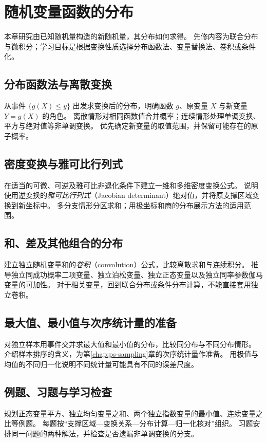 \setcounter{chapter}{5} %
\chapter{随机变量函数的分布}
\label{chap:ps-transformations}

本章研究由已知随机量构造的新随机量，其分布如何求得。
先修内容为联合分布与微积分；学习目标是根据变换性质选择分布函数法、变量替换法、卷积或条件化。

\section{分布函数法与离散变换}
\label{sec:ps-cdf-transform}
从事件 $\{g(X)\leq y\}$ 出发求变换后的分布，明确函数 $g$、原变量 $X$ 与新变量 $Y=g(X)$ 的角色。
离散情形对相同函数值合并概率；连续情形处理单调变换、平方与绝对值等非单调变换。
优先确定新变量的取值范围，并保留可能存在的原子概率。

\section{密度变换与雅可比行列式}
\label{sec:ps-jacobian}
在适当的可微、可逆及雅可比非退化条件下建立一维和多维密度变换公式。
说明使用逆变换的\emph{雅可比行列式}（Jacobian determinant）绝对值，并将原支撑区域变换到新坐标中。
多分支情形分区求和；用极坐标和商的分布展示方法的适用范围。

\section{和、差及其他组合的分布}
\label{sec:ps-convolution}
建立独立随机变量和的\emph{卷积}（convolution）公式，比较离散求和与连续积分。
推导独立同成功概率二项变量、独立泊松变量、独立正态变量以及独立同率参数伽马变量的可加性。
对于相关变量，回到联合分布或条件分布计算，不能直接套用独立卷积。

\section{最大值、最小值与次序统计量的准备}
\label{sec:ps-extreme-transform}
对独立样本用事件交并求最大值和最小值的分布，比较同分布与不同分布情形。
介绍样本排序的含义，为第\ref{chap:ps-sampling}章的次序统计量作准备。
用极值与均值的不同归一化说明不同统计量可能具有不同的误差尺度。

\section{例题、习题与学习检查}
规划正态变量平方、独立均匀变量之和、两个独立指数变量的最小值、连续变量之比等例题。
每题按“支撑区域---变换关系---分布计算---归一化核对”组织。
习题安排同一问题的两种解法，并检查是否遗漏非单调变换的分支。






